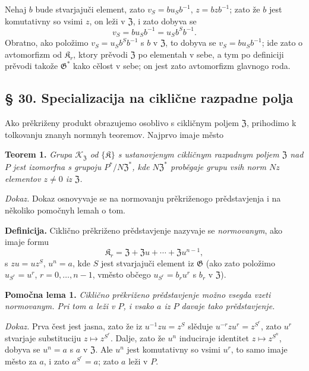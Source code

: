 \documentclass[11pt]{article}
\begin{document}
Nehaj \(b\) bude stvarjajuči element, zato \(v_S=bu_Sb^{-1}\), \(z=bzb^{-1}\); zato že \(b\) jest komutativny so vsimi \(z\), on leži v \(\mathfrak Z\), i zato dobyva se
\[
v_S=bu_Sb^{-1}=u_Sb^Sb^{-1}.
\]
Obratno, ako položimo \(v_S=u_Sb^Sb^{-1}\) s \(b\) v \(\mathfrak Z\), to dobyva se \(v_S=bu_Sb^{-1}\); ide zato o avtomorfizm od \(\mathfrak K_r\), ktory prěvodi \(\mathfrak Z\) po elementah v sebe, a tym po definiciji prěvodi takože \(\mathfrak G^*\) kako cělost v sebe; on jest zato avtomorfizm glavnogo roda.

\subsection*{§ 30. Specializacija na ciklične razpadne polja}\label{spezialisierung-auf-zyklische-zerfaellungskoerper}

Ako prěkriženy produkt obrazujemo osoblivo s cikličnym poljem \(\mathfrak Z\), prihodimo k tolkovanju znanyh normnyh teoremov. Najprvo imaje město

\noindent\textbf{Teorem 1.} \emph{Grupa \(\mathscr K_{\mathfrak Z}\) od \(\{\mathfrak K\}\) s ustanovjenym cikličnym razpadnym poljem \(\mathfrak Z\) nad \(P\) jest izomorfna s grupoju \(P^*/N\mathfrak Z^*\), kde \(N\mathfrak Z^*\) proběgaje grupu vsih norm \(Nz\) elementov \(z\neq0\) iz \(\mathfrak Z\).}

\noindent\emph{Dokaz.} Dokaz osnovyvaje se na normovanju prěkriženogo prědstavjenja i na několiko pomočnyh lemah o tom.

\noindent\textbf{Definicija.} Ciklično prěkriženo prědstavjenje nazyvaje se \emph{normovanym}, ako imaje formu
\[
\mathfrak K_r=\mathfrak Z+\mathfrak Zu+\cdots+\mathfrak Zu^{n-1},
\]
s \(zu=uz^S\), \(u^n=a\), kde \(S\) jest stvarjajuči element iz \(\mathfrak G\) (ako zato položimo \(u_{S^r}=u^r\), \(r=0,\ldots,n-1\), vměsto občego \(u_{S^r}=b_ru^r\) s \(b_r\) v \(\mathfrak Z\)).

\noindent\textbf{Pomočna lema 1.} \emph{Ciklično prěkriženo prědstavjenje možno vsegda vzeti normovanym. Pri tom \(a\) leži v \(P\), i vsako \(a\) iz \(P\) davaje tako prědstavjenje.}

\noindent\emph{Dokaz.} Prva čest jest jasna, zato že iz \(u^{-1}zu=z^S\) slěduje \(u^{-r}zu^r=z^{S^r}\), zato \(u^r\) stvarjaje substituciju \(z\mapsto z^{S^r}\). Dalje, zato že \(u^n\) induciraje identitet \(z\mapsto z^{S^n}\), dobyva se \(u^n=a\) s \(a\) v \(\mathfrak Z\). Ale \(u^n\) jest komutativny so vsimi \(u^r\), to samo imaje město za \(a\), i zato \(a^{S^r}=a\); zato \(a\) leži v \(P\).
\end{document}
